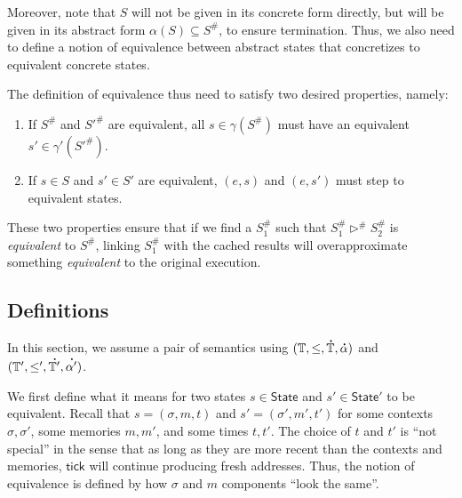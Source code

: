 \documentclass[acmsmall,screen,review]{acmart}\settopmatter{printfolios=true,printccs=false,printacmref=false}
\theoremstyle{acmdefinition}
\newcommand*{\A}[1]{\overset{\,_{\mbox{\Large .}}}{#1}}
\newcommand*{\Abs}[1]{{#1}^{\#}}
\newcommand*{\Time}{\mathbb{T}}
\newcommand*{\ATime}{\A{\Time}}
\newcommand*{\ctx}{\sigma}
\newcommand*{\mem}{m}
\newcommand*{\State}{\mathsf{State}}
\newcommand*{\tick}{\mathsf{tick}}
\begin{document}
Moreover, note that $S$ will not be given in its concrete form directly, but will be given in its abstract form $\alpha(S)\subseteq\Abs{S}$, to ensure termination.
Thus, we also need to define a notion of equivalence between abstract states that concretizes to equivalent concrete states.

The definition of equivalence thus need to satisfy two desired properties, namely:
\begin{enumerate}
  \item If $\Abs{S}$ and $\Abs{S'}$ are equivalent, all $s\in\gamma(\Abs{S})$ must have an equivalent $s'\in\gamma'(\Abs{S'})$.
  \item If $s\in S$ and $s'\in S'$ are equivalent, $(e,s)$ and $(e,s')$ must step to equivalent states.
\end{enumerate}
These two properties ensure that if we find a $\Abs{S}_1$ such that ${\Abs{S}_1}\Abs\rhd{\Abs{S}_2}$ is \emph{equivalent} to $\Abs{S}$, linking $\Abs{S}_1$ with the cached results will overapproximate something \emph{equivalent} to the original execution.

\subsection{Definitions}
In this section, we assume a pair of semantics using $(\Time,\le,\ATime,\A\alpha)$ and $(\Time',\le',\A{\Time'},\A{\alpha'})$.

We first define what it means for two states $s\in\State$ and $s'\in\State'$ to be equivalent.
Recall that $s=(\ctx,\mem,t)$ and $s'=(\ctx',\mem',t')$ for some contexts $\ctx,\ctx'$, some memories $\mem,\mem'$, and some times $t,t'$.
The choice of $t$ and $t'$ is ``not special'' in the sense that as long as they are more recent than the contexts and memories, $\tick$ will continue producing fresh addresses.
Thus, the notion of equivalence is defined by how $\ctx$ and $\mem$ components ``look the same''.
\end{document}
